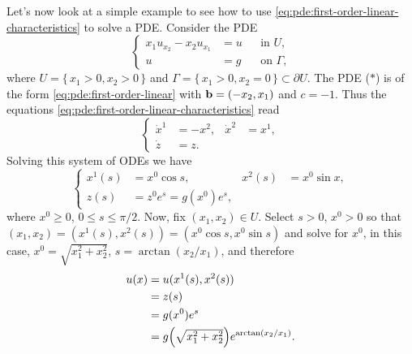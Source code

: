 \begin{example}
  Let's now look at a simple example to see how to use
  \eqref{eq:pde:first-order-linear-characteristics} to solve a PDE.
  Consider the PDE
  \[
    \tag{\(*\)}
    \left\{
      \begin{aligned}
        x_1u_{x_2}-x_2u_{x_1}&=u&&\text{in \(U\),}\\
        u&=g&&\text{on \(\Gamma\),}
      \end{aligned}
    \right.
  \]
  where \(U=\{\,x_1>0,x_2>0\,\}\) and
  \(\Gamma=\{\,x_1>0,x_2=0\,\}\subset\partial U\).  The PDE (\(*\)) is of
  the form \eqref{eq:pde:first-order-linear} with \(\mathbf{b}=(-x_2,x_1)\) and
  \(c=-1\). Thus the equations
  \eqref{eq:pde:first-order-linear-characteristics} read
  \[
    \left\{ \tag{\(**\)}
      \begin{aligned}
        \dot x^1&=-x^2,&\dot x^2&=x^1,\\
        \dot z&=z.
      \end{aligned}
    \right.
  \]
  Solving this system of ODEs we have
  \[
    \left\{
      \begin{aligned}
        x^1(s)&=x^0\cos s,&x^2(s)&=x^0\sin x,\\
        z(s)&=z^0e^s=g(x^0)e^s,
      \end{aligned}
    \right.
  \]
  where \(x^0\geq 0\), \(0\leq s\leq \pi/2\). Now, fix \((x_1,x_2)\in
  U\). Select \(s>0\), \(x^0>0\) so that
  \((x_1,x_2)=(x^1(s),x^2(s))=(x^0\cos s,x^0\sin s)\) and solve for
  \(x^0\), in this case, \(x^0=\sqrt{x_1^2+x_2^2}\),
  \(s=\arctan(x_2/x_1)\), and therefore
  \begin{align*}
    u(x)&=u(x^1(s),x^2(s))\\
        &=z(s)\\
        &=g(x^0)e^s\\
        &=g\Bigl({\textstyle\sqrt{x_1^2+x_2^2}}\Bigr)e^{\arctan(x_2/x_1)}.
  \end{align*}
\end{example}

